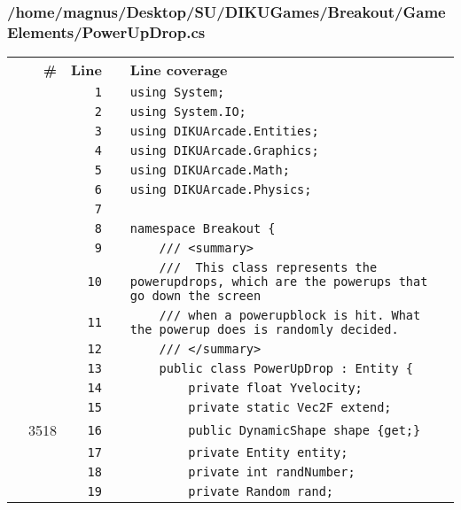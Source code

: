 \documentclass[a4paper,landscape,10pt]{article}
\begin{document}
\subsubsection{/home/magnus/Desktop/SU/DIKUGames/Breakout/GameElements/PowerUpDrop.cs}
\begin{longtable}[l]{lrrll}
\textbf{} & \textbf{\#} & \textbf{Line} & \textbf{} & \textbf{Line coverage}\\
\cellcolor{gray} &  & \verb~1~ & & \verb~using System;~\\
\cellcolor{gray} &  & \verb~2~ & & \verb~using System.IO;~\\
\cellcolor{gray} &  & \verb~3~ & & \verb~using DIKUArcade.Entities;~\\
\cellcolor{gray} &  & \verb~4~ & & \verb~using DIKUArcade.Graphics;~\\
\cellcolor{gray} &  & \verb~5~ & & \verb~using DIKUArcade.Math;~\\
\cellcolor{gray} &  & \verb~6~ & & \verb~using DIKUArcade.Physics;~\\
\cellcolor{gray} &  & \verb~7~ & & \verb~~\\
\cellcolor{gray} &  & \verb~8~ & & \verb~namespace Breakout {~\\
\cellcolor{gray} &  & \verb~9~ & & \verb~    /// <summary>~\\
\cellcolor{gray} &  & \verb~10~ & & \verb~    ///  This class represents the powerupdrops, which are the powerups that go down the screen~\\
\cellcolor{gray} &  & \verb~11~ & & \verb~    /// when a powerupblock is hit. What the powerup does is randomly decided.~\\
\cellcolor{gray} &  & \verb~12~ & & \verb~    /// </summary>~\\
\cellcolor{gray} &  & \verb~13~ & & \verb~    public class PowerUpDrop : Entity {~\\
\cellcolor{gray} &  & \verb~14~ & & \verb~        private float Yvelocity;~\\
\cellcolor{gray} &  & \verb~15~ & & \verb~        private static Vec2F extend;~\\
\cellcolor{green} & 3518 & \verb~16~ & & \verb~        public DynamicShape shape {get;}~\\
\cellcolor{gray} &  & \verb~17~ & & \verb~        private Entity entity;~\\
\cellcolor{gray} &  & \verb~18~ & & \verb~        private int randNumber;~\\
\cellcolor{gray} &  & \verb~19~ & & \verb~        private Random rand;~\\

\end{longtable}
\end{document}
